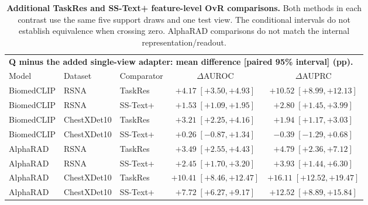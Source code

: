 \begin{table}[tp]
\centering
\footnotesize
\setlength{\tabcolsep}{4pt}
\begin{tabular*}{\textwidth}{@{\extracolsep{\fill}}lllcc@{}}
\toprule
\multicolumn{5}{l}{\textbf{Q minus the added single-view adapter: mean difference [paired 95\% interval] (pp).}} \\
Model & Dataset & Comparator & $\Delta$AUROC & $\Delta$AUPRC \\
\midrule
BiomedCLIP & RSNA & TaskRes & $+4.17\;[+3.50,+4.93]$ & $+10.52\;[+8.99,+12.13]$ \\
BiomedCLIP & RSNA & SS-Text+ & $+1.53\;[+1.09,+1.95]$ & $+2.80\;[+1.45,+3.99]$ \\
\addlinespace[2pt]
BiomedCLIP & ChestXDet10 & TaskRes & $+3.21\;[+2.25,+4.16]$ & $+1.94\;[+1.17,+3.03]$ \\
BiomedCLIP & ChestXDet10 & SS-Text+ & $+0.26\;[-0.87,+1.34]$ & $-0.39\;[-1.29,+0.68]$ \\
\addlinespace[2pt]
AlphaRAD & RSNA & TaskRes & $+3.49\;[+2.55,+4.43]$ & $+4.79\;[+2.36,+7.12]$ \\
AlphaRAD & RSNA & SS-Text+ & $+2.45\;[+1.70,+3.20]$ & $+3.93\;[+1.44,+6.30]$ \\
\addlinespace[2pt]
AlphaRAD & ChestXDet10 & TaskRes & $+10.41\;[+8.46,+12.47]$ & $+16.11\;[+12.52,+19.47]$ \\
AlphaRAD & ChestXDet10 & SS-Text+ & $+7.72\;[+6.27,+9.17]$ & $+12.52\;[+8.89,+15.84]$ \\
\bottomrule
\end{tabular*}
\caption{\textbf{Additional TaskRes and SS-Text+ feature-level OvR comparisons.} Both methods in each contrast use the same five support draws and one test view. The conditional intervals do not establish equivalence when crossing zero. AlphaRAD comparisons do not match the internal representation/readout.}
\label{tab:supp-taskres-sstext}
\end{table}
